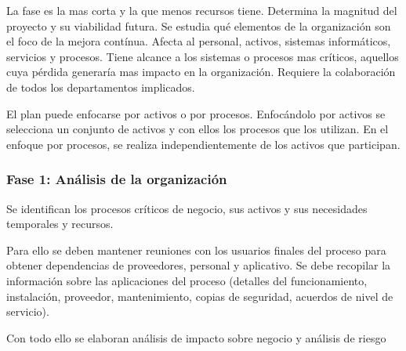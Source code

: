         La fase es la mas corta y la que menos recursos tiene. Determina la magnitud del proyecto y su viabilidad futura. Se estudia qué elementos de la organización son el foco de la mejora contínua. Afecta al personal, activos, sistemas informáticos, servicios y procesos. Tiene alcance a los sistemas o procesos mas críticos, aquellos cuya pérdida generaría mas impacto en la organización. Requiere la colaboración de todos los departamentos implicados.

        El plan puede enfocarse por activos o por procesos. Enfocándolo por activos se selecciona un conjunto de activos y con ellos los procesos que los utilizan. En el enfoque por procesos, se realiza independientemente de los activos que participan.

    \subsubsection{Fase 1: Análisis de la organización} %
        Se identifican los procesos críticos de negocio, sus activos y sus necesidades temporales y recursos.

        Para ello se deben mantener reuniones con los usuarios finales del proceso para obtener dependencias de proveedores, personal y aplicativo. Se debe recopilar la información sobre las aplicaciones del proceso (detalles del funcionamiento, instalación, proveedor, mantenimiento, copias de seguridad, acuerdos de nivel de servicio).

        Con todo ello se elaboran análisis de impacto sobre negocio y análisis de riesgo

